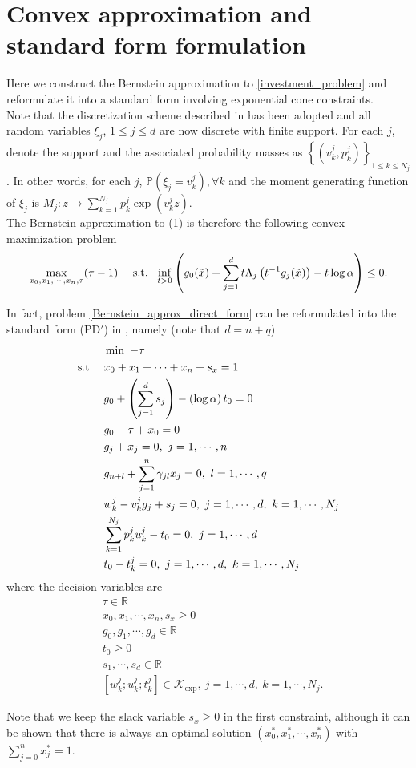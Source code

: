 \documentclass[11pt]{article}
\begin{document}
\section*{Convex approximation and standard form formulation }
Here we construct the Bernstein approximation to \eqref{investment_problem} and reformulate it into a standard form involving exponential cone constraints. \\

Note that the discretization scheme described in \cite{Nemirovsky_and_Shapiro} has been adopted and all random variables $\xi_j$, $1\leq j \leq d$ are now discrete with finite support. For each $j$, denote the support and the associated probability masses as $\left\{(v_k^j, p_k^j)\right\}_{1\leq k \leq N_j}$. In other words, for each $j$, $\mathbb{P}\left(\xi_j = v_k^j\right), \forall k$ and the moment generating function of $\xi_j$ is $M_j: z \rightarrow \sum_{k=1}^{N_j} p_k^j \exp \left(v_k^j z\right)$.\\

The Bernstein approximation to (1) is therefore the following convex maximization problem
\begin{align} \label{Bernstein_approx_direct_form}
\max_{x_0, x_1, \cdots, x_n, \tau} (\tau - 1)\ \ \ \ \textnormal{s.t.}\ \ \inf_{t>0} \left(g_0(\tilde{x}) + \sum_{j=1}^d t \Lambda_j\left(t^{-1}g_j(\tilde{x})\right) - t\log \alpha \right) \leq 0.
\end{align}

In fact, problem \eqref{Bernstein_approx_direct_form} can be reformulated into the standard form (PD$'$) in \cite{Gao_Yuan_thesis}, namely (note that $d = n+q$)
\begin{align}
\begin{split}\label{reformulated_std_conic_form}
&\min \ -\tau \\ 
\textnormal{s.t.}\ \ \ & x_0 + x_1 + \cdots + x_n + s_x = 1 \\
& g_0 + \left(\sum_{j=1}^d s_j\right) - \left(\log \alpha\right) t_0 = 0 \\
& g_0  - \tau + x_0 = 0 \\
& g_j + x_j = 0,\ j = 1, \cdots, n \\
& g_{n+l} + \sum_{j=1}^n \gamma_{jl} x_j = 0,\ l = 1, \cdots, q \\
& w_k^j - v_k^j g_j + s_j = 0,\ j = 1, \cdots,d,\ k = 1, \cdots, N_j \\
& \sum_{k=1}^{N_j} p_k^j u_k^j - t_0 = 0,\  j =1,\cdots,d \\
& t_0 - t_k^j = 0,\ j = 1,\cdots, d,\ k = 1,\cdots,N_j
\end{split}
\end{align}
where the decision variables are
\begin{align*}
& \tau \in \mathbb{R} \\
& x_0, x_1, \cdots, x_n, s_x \geq 0 \\
& g_0, g_1, \cdots, g_d \in \mathbb{R} \\
& t_0 \geq 0 \\
& s_1, \cdots, s_d \in \mathbb{R} \\
& [w_k^j; u_k^j; t_k^j] \in \mathcal{K}_{\exp},\ j = 1, \cdots, d,\ k = 1,\cdots, N_j.
\end{align*}

Note that we keep the slack variable $s_x \geq 0$ in the first constraint, although it can be shown that there is always an optimal solution $(x_0^*, x_1^*, \cdots, x_n^*)$ with $\sum_{j=0}^n x_j^* = 1$.

{}

\end{document}
